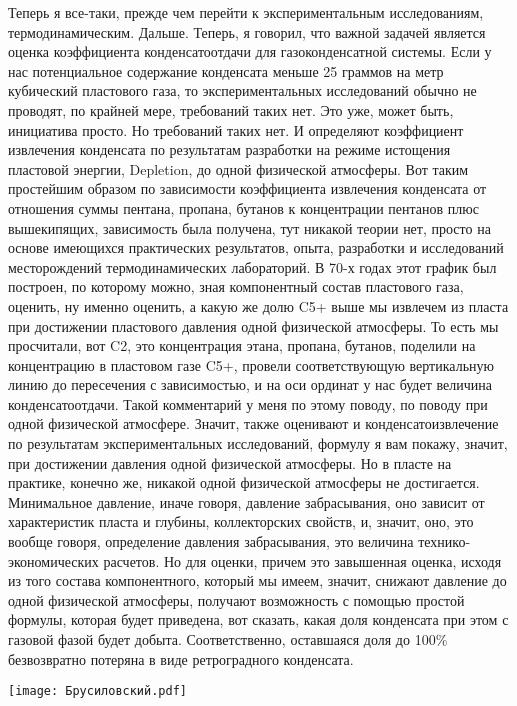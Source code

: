 \documentclass[main.tex]{subfiles}
\begin{document}
Теперь я все-таки, прежде чем перейти к экспериментальным исследованиям, термодинамическим.
Дальше. Теперь, я говорил, что важной задачей является оценка коэффициента конденсатоотдачи для газоконденсатной системы.
Если у нас потенциальное содержание конденсата меньше 25 граммов на метр кубический пластового газа, то экспериментальных исследований обычно не проводят, по крайней мере, требований таких нет.
Это уже, может быть, инициатива просто.
Но требований таких нет.
И определяют коэффициент извлечения конденсата по результатам разработки на режиме истощения пластовой энергии, Depletion, до одной физической атмосферы.
Вот таким простейшим образом по зависимости коэффициента извлечения конденсата от отношения суммы пентана, пропана, бутанов к концентрации пентанов плюс вышекипящих, зависимость была получена, тут никакой теории нет, просто на основе имеющихся практических результатов, опыта, разработки и исследований месторождений термодинамических лабораторий.
В 70-х годах этот график был построен, по которому можно, зная компонентный состав пластового газа, оценить, ну именно оценить, а какую же долю C5+ выше мы извлечем из пласта при достижении пластового давления одной физической атмосферы.
То есть мы просчитали, вот C2, это концентрация этана, пропана, бутанов, поделили на концентрацию в пластовом газе C5+, провели соответствующую вертикальную линию до пересечения с зависимостью, и на оси ординат у нас будет величина конденсатоотдачи.
Такой комментарий у меня по этому поводу, по поводу при одной физической атмосфере.
Значит, также оценивают и конденсатоизвлечение по результатам экспериментальных исследований, формулу я вам покажу, значит, при достижении давления одной физической атмосферы.
Но в пласте на практике, конечно же, никакой одной физической атмосферы не достигается.
Минимальное давление, иначе говоря, давление забрасывания, оно зависит от характеристик пласта и глубины, коллекторских свойств, и, значит, оно, это вообще говоря, определение давления забрасывания, это величина технико-экономических расчетов.
Но для оценки, причем это завышенная оценка, исходя из того состава компонентного, который мы имеем, значит, снижают давление до одной физической атмосферы, получают возможность с помощью простой формулы, которая будет приведена, вот сказать, какая доля конденсата при этом с газовой фазой будет добыта.
Соответственно, оставшаяся доля до 100\% безвозвратно потеряна в виде ретроградного конденсата.

\begin{center}
\texttt{[image: Брусиловский.pdf]}
\end{center}
\end{document}
